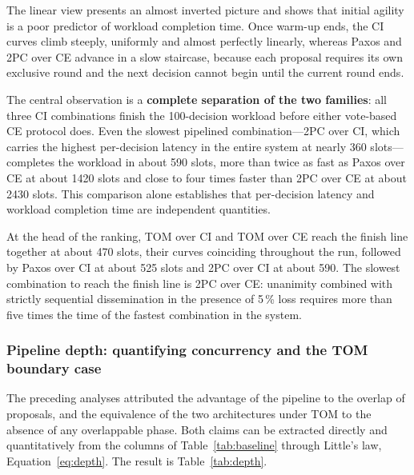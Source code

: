 \documentclass[journal]{IEEEtran}
\newcommand{\CI}{CI}                      %
\newcommand{\CE}{CE}                      %
\begin{document}
The linear view presents an almost inverted picture and shows that initial
agility is a poor predictor of workload completion time. Once warm-up
ends, the \CI{} curves climb steeply, uniformly and almost perfectly
linearly, whereas Paxos and 2PC over \CE{} advance in a slow staircase,
because each proposal requires its own exclusive round and the next
decision cannot begin until the current round ends.

The central observation is a \textbf{complete separation of the two
families}: all three \CI{} combinations finish the 100-decision workload
before either vote-based \CE{} protocol does. Even the slowest pipelined
combination---2PC over \CI, which carries the highest per-decision
latency in the entire system at nearly 360 slots---completes the workload
in about 590 slots, more than twice as fast as Paxos over \CE{} at about
1420 slots and close to four times faster than 2PC over \CE{} at about
2430 slots. This comparison alone establishes that per-decision latency
and workload completion time are independent quantities.

At the head of the ranking, TOM over \CI{} and TOM over \CE{} reach the
finish line together at about 470 slots, their curves coinciding
throughout the run, followed by Paxos over \CI{} at about 525 slots and
2PC over \CI{} at about 590. The slowest combination to reach the finish
line is 2PC over \CE: unanimity combined with strictly sequential
dissemination in the presence of 5\,\% loss requires more than five times
the time of the fastest combination in the system.

\subsubsection{Pipeline depth: quantifying concurrency and the TOM
boundary case}

The preceding analyses attributed the advantage of the pipeline to the
overlap of proposals, and the equivalence of the two architectures under
TOM to the absence of any overlappable phase. Both claims can be extracted
directly and quantitatively from the columns of
Table~\ref{tab:baseline} through Little's law,
Equation~\eqref{eq:depth}. The result is Table~\ref{tab:depth}.
\end{document}
